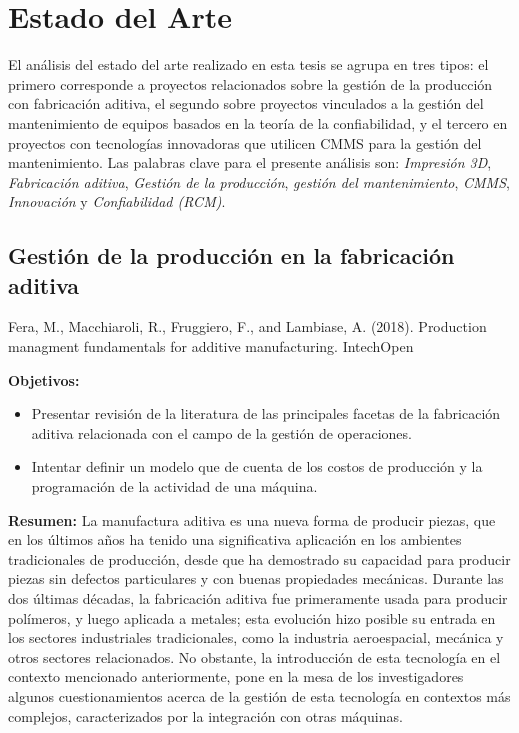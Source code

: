 \chapter{Estado del Arte}
\label{cap:estadodelarte}

El análisis del estado del arte realizado en esta tesis se agrupa en tres tipos: el primero corresponde a proyectos relacionados sobre la gestión de la producción con fabricación aditiva, el segundo sobre proyectos vinculados a la gestión del mantenimiento de equipos basados en la teoría de la confiabilidad, y el tercero en proyectos con tecnologías innovadoras que utilicen CMMS para la gestión del mantenimiento. Las palabras clave para el presente análisis son: \textit{Impresión 3D}, \textit{Fabricación aditiva}, \textit{Gestión de la producción}, \textit{gestión del mantenimiento}, \textit{CMMS}, \textit{Innovación} y \textit{Confiabilidad (RCM)}.

\section{Gestión de la producción en la fabricación aditiva}

Fera, M., Macchiaroli, R., Fruggiero, F., and Lambiase, A. (2018). Production managment fundamentals for additive manufacturing. IntechOpen

\begin{description}
\item \textbf{Objetivos:}
\begin{itemize}
\item Presentar revisión de la literatura de las principales facetas de la fabricación aditiva relacionada con el campo de la gestión de operaciones.
\item Intentar definir un modelo que de cuenta de los costos de producción y la programación de la actividad de una máquina.  
\end{itemize}
\end{description}

\begin{description}
\item \textbf{Resumen:} La manufactura aditiva es una nueva forma de producir piezas, que en los últimos años ha tenido una significativa aplicación en los ambientes tradicionales de producción, desde que ha demostrado su capacidad para producir piezas sin defectos particulares y con buenas propiedades mecánicas. Durante las dos últimas décadas, la fabricación aditiva fue primeramente usada para producir polímeros, y luego aplicada a metales; esta evolución hizo posible su entrada en los sectores industriales tradicionales, como la industria aeroespacial, mecánica y otros sectores relacionados. No obstante, la introducción de esta tecnología en el contexto mencionado anteriormente, pone en la mesa de los investigadores algunos cuestionamientos acerca de la gestión de esta tecnología en contextos más complejos, caracterizados por la integración con otras máquinas.  
\end{description}

